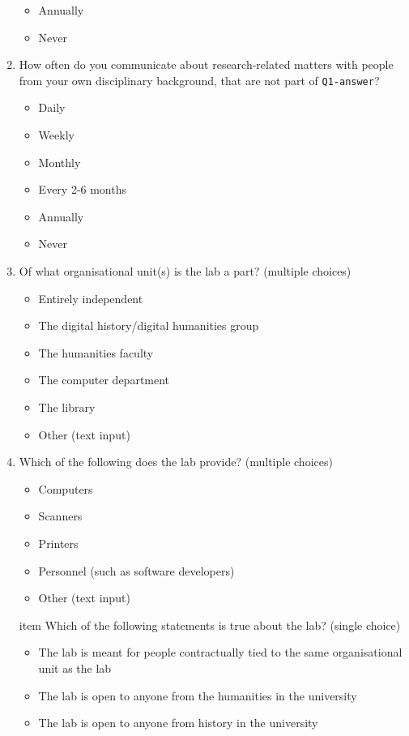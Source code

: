 \documentclass{article}
\begin{document}
\begin{enumerate}
\begin{itemize}
        \item Annually
        \item Never
    \end{itemize}
    \item How often do you communicate about research-related matters with people from your own disciplinary background, that are not part of \texttt{Q1-answer}?
    \begin{itemize}
        \item Daily
        \item Weekly
        \item Monthly
        \item Every 2-6 months
        \item Annually
        \item Never
    \end{itemize}
    \item Of what organisational unit(s) is the lab a part? (multiple choices)
    \begin{itemize}
        \item Entirely independent
        \item The digital history/digital humanities group
        \item The humanities faculty
        \item The computer department
        \item The library
        \item Other (text input)
    \end{itemize}
    \item Which of the following does the lab provide? (multiple choices)
    \begin{itemize}
        \item Computers
        \item Scanners
        \item Printers
        \item Personnel (such as software developers)
        \item Other (text input)
    \end{itemize}
    item Which of the following statements is true about the lab? (single choice)
    \begin{itemize}
        \item The lab is meant for people contractually tied to the same organisational unit as the lab
        \item The lab is open to anyone from the humanities in the university
        \item The lab is open to anyone from history in the university

\end{itemize}
\end{enumerate}
\end{document}
